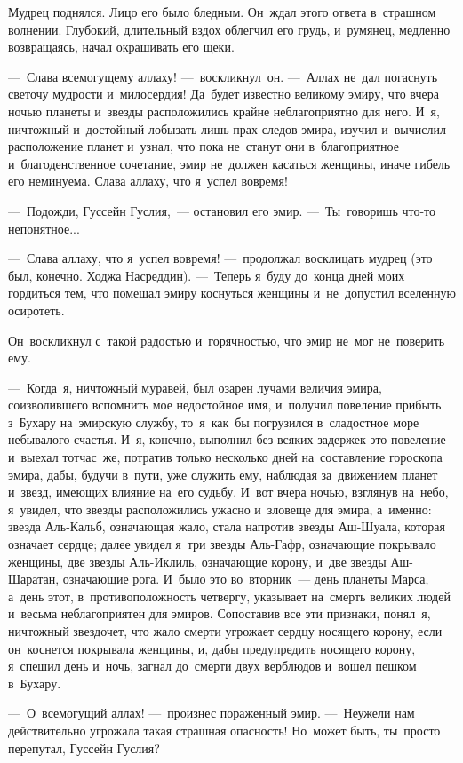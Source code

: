\documentclass[12pt,a4paper]{book}
\begin{document}
Мудрец поднялся. Лицо его было бледным. Он~ждал этого ответа в~страшном волнении. Глубокий, длительный вздох облегчил его грудь, и~румянец, медленно возвращаясь, начал окрашивать его щеки.

—~Слава всемогущему аллаху! —~воскликнул~он. —~Аллах не~дал погаснуть светочу мудрости и~милосердия! Да~будет известно великому эмиру, что вчера ночью планеты и~звезды расположились крайне неблагоприятно для него. И~я, ничтожный и~достойный лобызать лишь прах следов эмира, изучил и~вычислил расположение планет и~узнал, что пока не~станут они в~благоприятное и~благоденственное сочетание, эмир не~должен касаться женщины, иначе гибель его неминуема. Слава аллаху, что я~успел вовремя!

—~Подожди, Гуссейн Гуслия,~— остановил его эмир. —~Ты~говоришь что-то непонятное...

—~Слава аллаху, что я~успел вовремя! —~продолжал восклицать мудрец (это был, конечно. Ходжа Насреддин). —~Теперь я~буду до~конца дней моих гордиться тем, что помешал эмиру коснуться женщины и~не~допустил вселенную осиротеть.

Он~воскликнул с~такой радостью и~горячностью, что эмир не~мог не~поверить ему.

—~Когда~я, ничтожный муравей, был озарен лучами величия эмира, соизволившего вспомнить мое недостойное имя, и~получил повеление прибыть з~Бухару на~эмирскую службу, то~я~как~бы погрузился в~сладостное море небывалого счастья. И~я, конечно, выполнил без всяких задержек это повеление и~выехал тотчас~же, потратив только несколько дней на~составление гороскопа эмира, дабы, будучи в~пути, уже служить ему, наблюдая за~движением планет и~звезд, имеющих влияние на~его судьбу. И~вот вчера ночью, взглянув на~небо, я~увидел, что звезды расположились ужасно и~зловеще для эмира, а~именно: звезда Аль-Кальб, означающая жало, стала напротив звезды Аш-Шуала, которая означает сердце; далее увидел я~три звезды Аль-Гафр, означающие покрывало женщины, две звезды Аль-Иклиль, означающие корону, и~две звезды Аш-Шаратан, означающие рога. И~было это во~вторник~— день планеты Марса, а~день этот, в~противоположность четвергу, указывает на~смерть великих людей и~весьма неблагоприятен для эмиров. Сопоставив все эти признаки, понял~я, ничтожный звездочет, что жало смерти угрожает сердцу носящего корону, если он~коснется покрывала женщины, и, дабы предупредить носящего корону, я~спешил день и~ночь, загнал до~смерти двух верблюдов и~вошел пешком в~Бухару.

—~О~всемогущий аллах! —~произнес пораженный эмир. —~Неужели нам действительно угрожала такая страшная опасность! Но~может быть, ты~просто перепутал, Гуссейн Гуслия?
\end{document}
